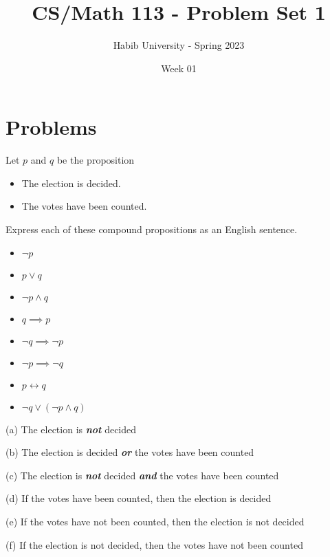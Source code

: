 \documentclass[addpoints]{exam}
\title{CS/Math 113 - Problem Set 1}
\author{Habib University - Spring 2023}
\date{Week 01}
\newenvironment{problem}[2][Problem]{\begin{trivlist}
    \item[\hskip \labelsep {\bfseries #1}\hskip \labelsep {\bfseries #2.}]}{\end{trivlist}}
\begin{document}
\maketitle
\section{Problems}
\begin{sloppypar}
\begin{problem}{1}
Let $p$ and $q$ be the proposition
\begin{itemize}
    \item[$p:$] The election is decided.
    \item[$q:$] The votes have been counted.
\end{itemize}
Express each of these compound propositions as an English sentence.

\begin{itemize}
    \item[(a)] $\neg p$
    \item[(b)] $p \lor q$
    \item[(c)] $\neg p \land q $
    \item[(d)] $q \implies p $
    \item[(e)] $ \neg q \implies \neg p $
    \item[(f)] $\neg p \implies \neg q$
    \item[(g)] $p \leftrightarrow q$
    \item[(h)] $\neg q \lor (\neg p \land q) $
\end{itemize}
\end{problem}

\begin{questions}
    \question
    \begin{solution}
        
        (a) The election is \textbf{\textit{not}} decided

        (b) The election is decided \textbf{\textit{or}} the votes have been counted

        (c) The election is \textbf{\textit{not}} decided \textbf{\textit{and}} the votes have been counted

        (d) If the votes have been counted, then the election is decided

        (e) If the votes have not been counted, then the election is not decided 

        (f) If the election is not decided, then the votes have not been counted 


\end{solution}
\end{questions}
\end{sloppypar}
\end{document}
